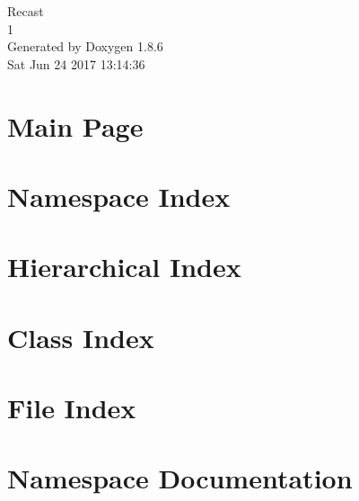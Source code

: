 \documentclass[twoside]{book}
\newcommand{\clearemptydoublepage}{%
  \newpage{\pagestyle{empty}\cleardoublepage}%
}
\begin{document}
\hypersetup{pageanchor=false}
\begin{titlepage}
\vspace*{7cm}
\begin{center}%
{\Large Recast \\[1ex]\large 1 }\\
\vspace*{1cm}
{\large Generated by Doxygen 1.8.6}\\
\vspace*{0.5cm}
{\small Sat Jun 24 2017 13:14:36}\\
\end{center}
\end{titlepage}
\clearemptydoublepage
\tableofcontents
\clearemptydoublepage
{}
\hypersetup{pageanchor=true}

\chapter{Main Page}
\label{index}\hypertarget{index}{}
\chapter{Namespace Index}

\chapter{Hierarchical Index}

\chapter{Class Index}

\chapter{File Index}

\chapter{Namespace Documentation}
























\end{document}
